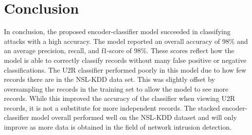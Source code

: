 \documentclass{article}
\begin{document}
\section{Conclusion}

In conclusion, the proposed encoder-classifier model succeeded in classifying attacks with a high accuracy. The model reported an overall accuracy of 98\% and an average precision, recall, and f1-score of 98\%. These scores reflect how the model is able to correctly classify records without many false positive or negative classifications. The U2R classifier performed poorly in this model due to how few records there are in the NSL-KDD data set. This was slightly offset by oversampling the records in the training set to allow the model to see more records. While this improved the accuracy of the classifier when viewing U2R records, it is not a substitute for more independent records. The stacked encoder-classifier model overall performed well on the NSL-KDD dataset and will only improve as more data is obtained in the field of network intrusion detection.

\pagebreak



\end{document}
